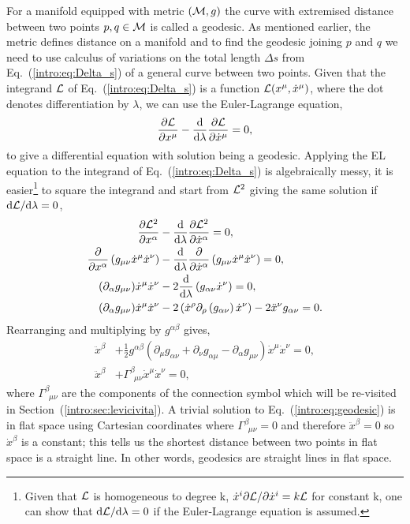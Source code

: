  For a manifold equipped with metric $(\mathcal{M},g)$ the curve with extremised distance
 between two points $p,q\in\mathcal{M}$ is called a geodesic. As mentioned earlier, the metric
 defines distance on a manifold and to find the geodesic joining
 $p$ and $q$ we need to use calculus of variations on the total length $\Delta s$
 from Eq.~(\ref{intro:eq:Delta_s}) of a general curve between two points. Given
 that the integrand $\mathcal{L}$ of Eq.~(\ref{intro:eq:Delta_s}) is a function
 $\mathcal{L}(x^\mu,\dot{x}^\mu)$, where the dot denotes differentiation by $\lambda$,
 we can use the Euler-Lagrange equation,
\begin{align}
\frac{\partial{\mathcal{L}}}{\partial x^\mu} - \frac{\dd}{\dd \lambda}\frac{\partial \mathcal{L}}{\partial \dot{x}^\mu} = 0,
\end{align}
to give a differential equation with solution being a geodesic. Applying the EL equation to the integrand of Eq.~(\ref{intro:eq:Delta_s}) is algebraically messy, it is easier\footnote{Given that $\mathcal{L}$ is homogeneous to degree k, $\dot{x}^i \partial \mathcal{L} / \partial \dot{x}^i = k\mathcal{L}$ for constant k, one can show that $\dd\mathcal{L}/\dd\lambda=0$ if the Euler-Lagrange equation is assumed.} to square the integrand and start from $\mathcal{L}^2$ giving the same solution if $\dd \mathcal{L} / \dd \lambda=0$,
\begin{align}
\frac{\partial{\mathcal{L}^2}}{\partial x^\alpha} &- \frac{\dd}{\dd \lambda}\frac{\partial \mathcal{L}^2}{\partial \dot{x}^\alpha} = 0, \\
\frac{\partial}{\partial x^\alpha} \left(g_{\mu\nu}\dot{x}^\mu\dot{x}^\nu\right) &- \frac{\dd}{\dd \lambda}\frac{\partial }{\partial \dot{x}^\alpha}\left(g_{\mu\nu}\dot{x}^\mu\dot{x}^\nu\right) = 0, \\
(\partial_\alpha g_{\mu\nu})\dot{x}^\mu\dot{x}^\nu &- 2\frac{\dd}{\dd \lambda}\left(g_{\alpha\nu}\dot{x}^\nu\right) = 0, \\
(\partial_\alpha g_{\mu\nu})\dot{x}^\mu\dot{x}^\nu &- 2\left(\dot{x}^\rho \partial_\rho \left(g_{\alpha\nu}\right)\dot{x}^\nu\right) - 2\ddot{x}^\nu g_{\alpha\nu} =0.
\end{align}
Rearranging and multiplying by $g^{\alpha\beta}$ gives,
\begin{align}
\ddot{x}^\beta &+ \frac{1}{2}g^{\alpha\beta}\left(\partial_{\mu}g_{\alpha\nu} +\partial_{\nu}g_{\alpha\mu} -\partial_{\alpha}g_{\mu\nu} \right)\dot{x}^\mu\dot{x}^\nu=0,\\
 \ddot{x}^\beta &+ \Gamma^\beta_{\,\,\,\mu\nu}\dot{x}^\mu\dot{x}^\nu=0, \label{intro:eq:geodesic}
\end{align}
where $\Gamma^\beta_{\,\,\,\mu\nu}$ are the components of the connection symbol which will be re-visited in Section~(\ref{intro:sec:levicivita}). A trivial solution to Eq.~(\ref{intro:eq:geodesic}) is in flat space using Cartesian coordinates where $\Gamma^\beta_{\,\,\,\mu\nu}=0$ and therefore $\ddot{x}^\beta=0$ so $\dot{x}^\beta$ is a constant; this tells us the shortest distance between two points in flat space is a straight line. In other words, geodesics are straight lines in flat space.



